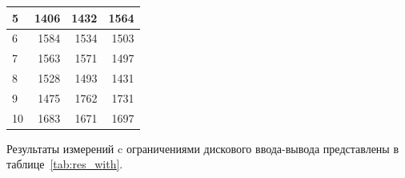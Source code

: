 \begin{table}[H]
\begin{center}
\begin{tabular}{|l|r|r|r|}
5                                       & 1406                                                                                      & 1432                                                                                      & 1564                                                                                      \\ \hline
6                                       & 1584                                                                                      & 1534                                                                                      & 1503                                                                                      \\ \hline
7                                       & 1563                                                                                      & 1571                                                                                      & 1497                                                                                      \\ \hline
8                                       & 1528                                                                                      & 1493                                                                                      & 1431                                                                                      \\ \hline
9                                       & 1475                                                                                      & 1762                                                                                      & 1731                                                                                      \\ \hline
10                                      & 1683                                                                                      & 1671                                                                                      & 1697                                                                                      \\ \hline
\end{tabular}
\end{center}
\end{table}


\newpage

Результаты измерений c ограничениями дискового ввода-вывода представлены в таблице~\ref{tab:res_with}.


